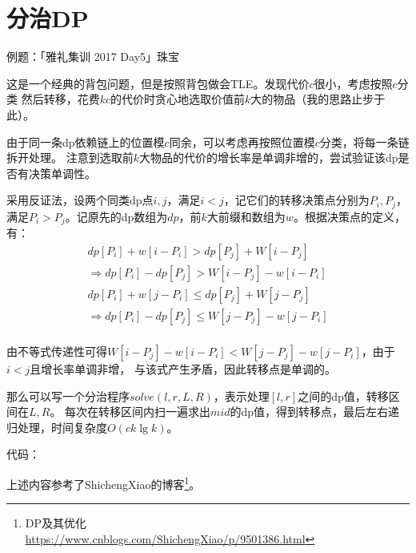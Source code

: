 \section{分治DP}
例题：「雅礼集训 2017 Day5」珠宝

这是一个经典的背包问题，但是按照背包做会TLE。发现代价$c$很小，考虑按照$c$分类
然后转移，花费$kc$的代价时贪心地选取价值前$k$大的物品（我的思路止步于此）。

由于同一条dp依赖链上的位置模$c$同余，可以考虑再按照位置模$c$分类，将每一条链拆开处理。
注意到选取前$k$大物品的代价的增长率是单调非增的，尝试验证该dp是否有决策单调性。

采用反证法，设两个同类dp点$i,j$，满足$i<j$，记它们的转移决策点分别为$P_i,P_j$，
满足$P_i>P_j$。记原先的dp数组为$dp$，前$k$大前缀和数组为$w$。根据决策点的定义，有：
\begin{eqnarray*}
    dp[P_i]+w[i-P_i]>dp[P_j]+W[i-P_j]\\
    \Rightarrow dp[P_i]-dp[P_j]>W[i-P_j]-w[i-P_i]\\
    dp[P_i]+w[j-P_i]\leq dp[P_j]+W[j-P_j]\\
    \Rightarrow dp[P_i]-dp[P_j]\leq W[j-P_j]-w[j-P_i]\\
\end{eqnarray*}

由不等式传递性可得$W[i-P_j]-w[i-P_i]<W[j-P_j]-w[j-P_i]$，由于$i<j$且增长率单调非增，
与该式产生矛盾，因此转移点是单调的。

那么可以写一个分治程序$solve(l,r,L,R)$，表示处理$[l,r]$之间的dp值，转移区间在$L,R$。
每次在转移区间内扫一遍求出$mid$的dp值，得到转移点，最后左右递归处理，时间复杂度$O(ck\lg k)$。

代码：


上述内容参考了ShichengXiao的博客\footnote{
    DP及其优化\\
    \url{https://www.cnblogs.com/ShichengXiao/p/9501386.html}
}。
